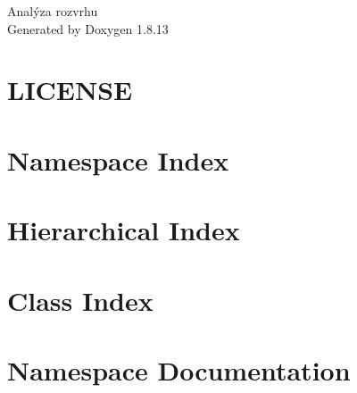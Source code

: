 \documentclass[twoside]{book}
\newcommand{\+}{\discretionary{\mbox{\scriptsize$\hookleftarrow$}}{}{}}
\newcommand{\clearemptydoublepage}{%
  \newpage{\pagestyle{empty}\cleardoublepage}%
}
\begin{document}
\hypersetup{pageanchor=false,
             bookmarksnumbered=true,
             pdfencoding=unicode
            }
\begin{titlepage}
\vspace*{7cm}
\begin{center}%
{\Large Analýza rozvrhu }\\
\vspace*{1cm}
{\large Generated by Doxygen 1.8.13}\\
\end{center}
\end{titlepage}
\clearemptydoublepage
{}
\tableofcontents
\clearemptydoublepage
{}
\hypersetup{pageanchor=true}

\chapter{L\+I\+C\+E\+N\+SE}
\label{md_packages__newtonsoft_8_json_810_80_82__l_i_c_e_n_s_e}

\chapter{Namespace Index}

\chapter{Hierarchical Index}

\chapter{Class Index}

\chapter{Namespace Documentation}



\end{document}

